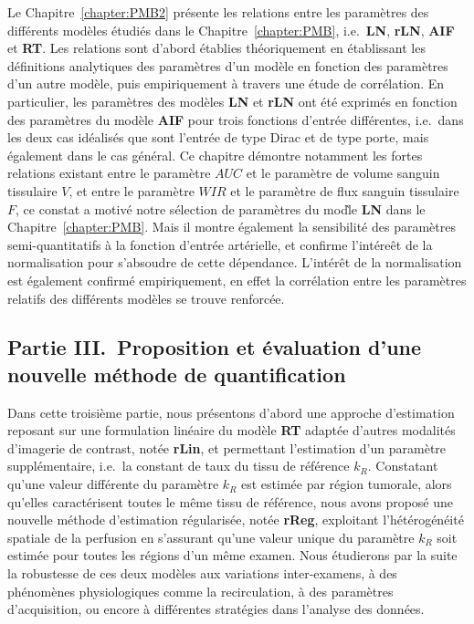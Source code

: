 \begin{otherlanguage}{francais}
Le Chapitre~\ref{chapter:PMB2} pr\'esente les relations entre les param\`etres des diff\'erents mod\`eles \'etudi\'es dans le Chapitre~\ref{chapter:PMB}, i.e.~\textbf{LN}, \textbf{rLN}, \textbf{AIF} et \textbf{RT}.
Les relations sont d'abord \'etablies th\'eoriquement en \'etablissant les d\'efinitions analytiques des param\`etres d'un mod\`ele en fonction des param\`etres d'un autre mod\`ele, puis empiriquement \`a travers une \'etude de corr\'elation.
En particulier, les param\`etres des mod\`eles \textbf{LN} et \textbf{rLN} ont \'et\'e exprim\'es en fonction des param\`etres du mod\`ele \textbf{AIF} pour trois fonctions d'entr\'ee diff\'erentes, i.e.~dans les deux cas id\'ealis\'es que sont l'entr\'ee de type Dirac et de type porte, mais \'egalement dans le cas g\'en\'eral.
Ce chapitre d\'emontre notamment les fortes relations existant entre le param\`etre $AUC$ et le param\`etre de volume sanguin tissulaire $V$, et entre le param\`etre $WIR$ et le param\`etre de flux sanguin tissulaire $F$, ce constat a motiv\'e notre s\'election de param\`etres du mod\`le \textbf{LN} dans le Chapitre~\ref{chapter:PMB}. 
Mais il montre \'egalement la sensibilit\'e des param\`etres semi-quantitatifs \`a la fonction d'entr\'ee art\'erielle, et confirme l'int\'ere\^et de la normalisation pour s'absoudre de cette d\'ependance.
L'int\'er\^et de la normalisation est \'egalement confirm\'e empiriquement, en effet la corr\'elation entre les param\`etres relatifs des diff\'erents mod\`eles se trouve renforc\'ee.

\subsection*{Partie III.~Proposition et \'evaluation d'une nouvelle m\'ethode de quantification}
Dans cette troisi\`eme partie, nous pr\'esentons d'abord une approche d'estimation reposant sur une formulation lin\'eaire du mod\`ele \textbf{RT} adapt\'ee d'autres modalit\'es d'imagerie de contrast, not\'ee \textbf{rLin}, et permettant l'estimation d'un param\`etre suppl\'ementaire, i.e.~la constant de taux du tissu de r\'ef\'erence $k_R$.
Constatant qu'une valeur diff\'erente du param\`etre $k_R$ est estim\'ee par r\'egion tumorale, alors qu'elles caract\'erisent toutes le m\^eme tissu de r\'ef\'erence, nous avons propos\'e une nouvelle m\'ethode d'estimation r\'egularis\'ee, not\'ee \textbf{rReg}, exploitant l'h\'et\'erog\'en\'eit\'e spatiale de la perfusion en s'assurant qu'une valeur unique du param\`etre $k_R$ soit estim\'ee pour toutes les r\'egions d'un m\^eme examen.
Nous \'etudierons par la suite la robustesse de ces deux mod\`eles aux variations inter-examens, \`a des ph\'enom\`enes physiologiques comme la recirculation, \`a des param\`etres d'acquisition, ou encore \`a diff\'erentes strat\'egies dans l'analyse des donn\'ees.


\end{otherlanguage}

